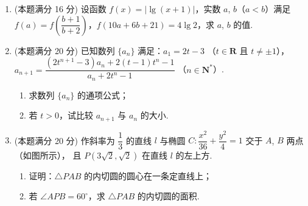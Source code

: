 \documentclass{chsmc}
\begin{document}
\begin{enumerate}[resume]
	\item (本题满分 16 分) 设函数 $f(x) = |\lg(x+1)|$，实数 $a$, $b$（$a < b$）满足
		$f(a) = f\left(\dfrac{b+1}{b+2}\right)$，$f(10a + 6b + 21) = 4\lg 2$，求 $a$, $b$
		的值.
	\item (本题满分 20 分) 已知数列 $\{a_n\}$ 满足：$a_1 = 2t - 3$
		（$t \in \mathbf{R}$ 且 $t \neq \pm 1$），
		$a_{n+1} = \dfrac{(2t^{n+1}-3)a_n + 2(t-1)t^n - 1}{a_n + 2t^n - 1}$
		（$n \in \mathbf{N}^*$）.
    \begin{enumerate}[(1)]
      \item 求数列 $\{a_n\}$ 的通项公式；
      \item 若 $t > 0$，试比较 $a_{n+1}$ 与 $a_n$ 的大小.
    \end{enumerate}
	\item (本题满分 20 分) 作斜率为 $\dfrac{1}{3}$ 的直线 $l$ 与椭圆
		$C\colon \dfrac{x^2}{36} + \dfrac{y^2}{4} = 1$ 交于 $A$, $B$ 两点（如图所示），
		且 $P(3\sqrt{2},\sqrt{2})$ 在直线 $l$ 的左上方.
    \begin{enumerate}[(1)]
      \item 证明：$\triangle PAB$ 的内切圆的圆心在一条定直线上；
      \item 若 $\angle APB = 60^\circ$，求 $\triangle PAB$ 的内切圆的面积.
    \end{enumerate}
\end{enumerate}
\end{document}
